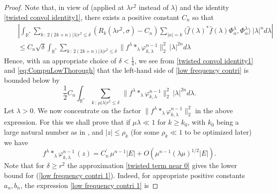 \documentclass[11pt, reqno]{amsart}
\theoremstyle{plain}
\newcommand{\R}{\ensuremath{\mathbb{R_+}}}
\theoremstyle{remark}
\theoremstyle{example}
\theoremstyle{definition}
\numberwithin{equation}{section}
\def\R{\mathbb{R}}
\begin{document}
\begin{proof}
Note that,  in view of  (applied at $\lambda r^2$ instead of $\lambda$) and the identity \eqref{twisted convol identity1}, there exists a positive constant $C_{n}$ so that
\begin{eqnarray}
\nonumber && \left|\int_{\R^{*}} \sum_{k \, : \, 2(2k +n) |\lambda | r^2 \leq \delta} \left(R_{k}(\lambda r^{2},\sigma) -C_n\right)\sum_{|\alpha|=k} \langle \hat{f}(\lambda)^{*} \hat{f}(\lambda) \Phi_{\alpha}^{\lambda},\Phi_{\alpha}^{\lambda} \rangle \ |\lambda|^n d\lambda\right|\\
&&\leq C_{n} \sqrt{\delta} \int_{\R^{*}} \sum_{k \, : \, 2(2k +n) |\lambda | r^2 \leq \delta}\| f^{\lambda} \ast_{\lambda} \varphi_{k, \lambda}^{n-1} \|_{2}^2 \ |\lambda|^{2n} d\lambda \label{eq:CompuLowThorough}
\end{eqnarray}
Hence, with an appropriate choice of $\delta<\frac14$, we see from  \eqref{twisted convol identity1} and \eqref{eq:CompuLowThorough} that the left-hand  side of \eqref{low frequency contri} is  bounded below by
    \begin{equation}\label{low frequency contri 1}
    \frac12C_n\int_{\R^{*}} \sum_{k \, : \, \mu |\lambda | r^2 \leq \delta } \,   \| f^{\lambda} \ast_{\lambda} \varphi_{k, \lambda}^{n-1} \|_{2}^2 \ |\lambda|^{2n} d\lambda.
\end{equation}
Let $\lambda>0$. We now concentrate on the factor $\| f^{\lambda} \ast_{\lambda} \varphi_{k, \lambda}^{n-1} \|_{2}^2$ in the above expression. For this we shall prove that if  $\mu \lambda \ll 1$ for $k \geq k_{0}$, with $k_{0}$ being a large natural number as in , and $| z| \leq \rho_{k}$ (for some $\rho_{k} \ll 1$ to be optimized later) we have
\begin{equation}\label{twisted term near 0}
    f^{\lambda} \ast_{\lambda} \varphi_{k, \lambda}^{n-1} \, (z) = C_{n}^{\prime} \, \mu^{n-1} |E| +   O (  \mu^{n-1} (\lambda \mu)^{1/2} |E|).
\end{equation}
Note that for $\delta \geq r^2$ the approximation \eqref{twisted term near 0} gives the lower bound for (\ref{low frequency contri 1}). Indeed, for appropriate positive constants $a_n,b_n$,  the expression \eqref{low frequency contri 1} is 



\end{proof}
\end{document}
